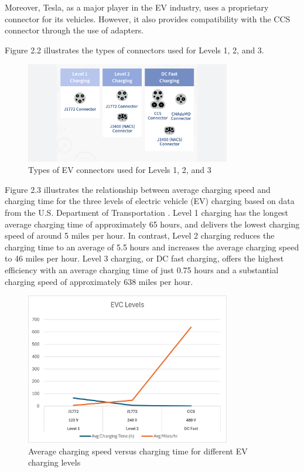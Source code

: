 Moreover, Tesla, as a major player in the EV industry, uses a proprietary connector for its vehicles. However, it also provides compatibility with the CCS connector through the use of adapters\cite{Alternative Fuels Data Center}.

Figure 2.2 illustrates the types of connectors used for Levels 1, 2, and 3.


\begin{figure}[h]
    \centering
    \includegraphics[width=0.8\textwidth]{../Figures/EV_connecters.PNG}
    \caption{Types of EV connectors used for Levels 1, 2, and 3 \cite{Alternative Fuels Data Center}}
    \label{fig:EV connectors}
\end{figure}

\clearpage
Figure 2.3 illustrates the relationship between average charging speed and charging time for the three levels of electric vehicle (EV) charging based on data from the U.S. Department of Transportation \cite{U.S. Department of Transportation}. Level 1 charging has the longest average charging time of approximately 65 hours, and delivers the lowest charging speed of around 5 miles per hour. In contrast, Level 2 charging reduces the charging time to an average of 5.5 hours and increases the average charging speed to 46 miles per hour. Level 3 charging, or DC fast charging, offers the highest efficiency with an average charging time of just 0.75 hours and a substantial charging speed of approximately 638 miles per hour. 

\begin{figure}[h]
    \centering
    \includegraphics[width=0.8\textwidth]{../Figures/EVC_Levels.png}
    \caption{Average charging speed versus charging time for different EV charging levels}
    \label{fig:EVC Levels}
\end{figure}


